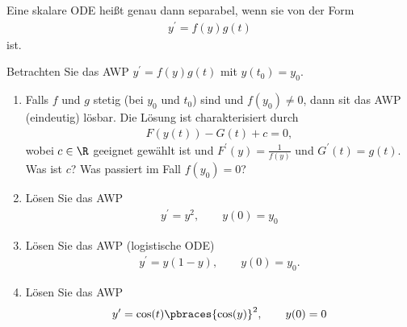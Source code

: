 \begin{definition}
    Eine skalare ODE heißt genau dann separabel, wenn sie von der Form
    \begin{align*}
        y^\prime = f(y)g(t) 
    \end{align*}
    ist.
\end{definition}

\begin{exercise}
    Betrachten Sie das AWP $y^\prime = f(y)g(t)$ mit $y(t_0) = y_0$. 
    \begin{enumerate}[label = \alph*)]
        \item Falls $f$ und $g$ stetig (bei $y_0$ und $t_0$) sind und $f(y_0) \neq 0$, dann sit das AWP (eindeutig) lösbar. Die Lösung ist charakterisiert durch
        \begin{align}
            F(y(t)) - G(t) + c = 0, \label{charakter}
        \end{align}
        wobei $c \in \R$ geeignet gewählt ist und $F^\prime(y) = \frac{1}{f(y)}$ und $G^\prime(t) = g(t)$. Was ist $c$? Was passiert im Fall $f(y_0) = 0$?
        \item Lösen Sie das AWP 
        \begin{align*}
            y^\prime = y^2, \qquad y(0) = y_0
        \end{align*}
        \item Lösen Sie das AWP (logistische ODE)
        \begin{align*}
            y^\prime = y(1 - y), \qquad y(0) = y_0.
        \end{align*}
        \item Lösen Sie das AWP
        \begin{align*}
            y^\prime = \cos(t) \pbraces{\cos(y)}^2, \qquad y(0) = 0
        \end{align*}
    \end{enumerate}
\end{exercise}
